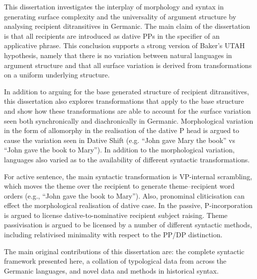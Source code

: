 \singlespacing
This dissertation investigates the interplay of morphology and syntax in generating surface complexity and the universality of argument structure by analysing recipient ditransitives in Germanic. The main claim of the dissertation is that all recipients are introduced as dative PPs in the specifier of an applicative phrase. This conclusion supports a strong version of Baker's UTAH hypothesis, namely that there is no variation between natural languages in argument structure and that all surface variation is derived from transformations on a uniform underlying structure.

In addition to arguing for the base generated structure of recipient ditransitives, this dissertation also explores transformations that apply to the base structure and show how these transformations are able to account for the surface variation seen both synchronically and diachronically in Germanic. Morphological variation in the form of allomorphy in the realisation of the dative P head is argued to cause the variation seen in Dative Shift (e.g. ``John gave Mary the book'' vs ``John gave the book to Mary''). In addition to the morphological variation, languages also varied as to the availability of different syntactic transformations.

For active sentence, the main syntactic transformation is VP-internal scrambling, which moves the theme over the recipient to generate theme--recipient word orders (e.g., ``John gave the book to Mary''). Also, pronominal cliticisation can effect the morphological realisation of dative case. In the passive, P-incorporation is argued to license dative-to-nominative recipient subject raising. Theme passivisation is argued to be licensed by a number of different syntactic methods, including relativised minimality with respect to the PP/DP distinction.

The main original contributions of this dissertation are: the complete syntactic framework presented here, a collation of typological data from across the Germanic languages, and novel data and methods in historical syntax.

\doublespacing
